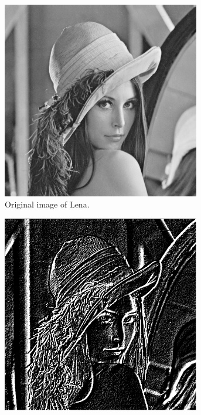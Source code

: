 \documentclass{article}
\theoremstyle{problemstyle}
\begin{document}
\begin{problem}
\begin{enumerate}[a)]
	      \begin{figure}[H]
		      \begin{subfigure}{.45\textwidth}
			      \centering
			      \includegraphics[width=0.95\textwidth]{lena_ascii.png}
			      \caption{Original image of Lena.}
		      \end{subfigure}
		      \hfill
		      \begin{subfigure}{.45\textwidth}
			      \centering
			      \includegraphics[width=0.95\textwidth]{lena_scharr.png}

\end{subfigure}
\end{figure}
\end{enumerate}
\end{problem}
\end{document}
